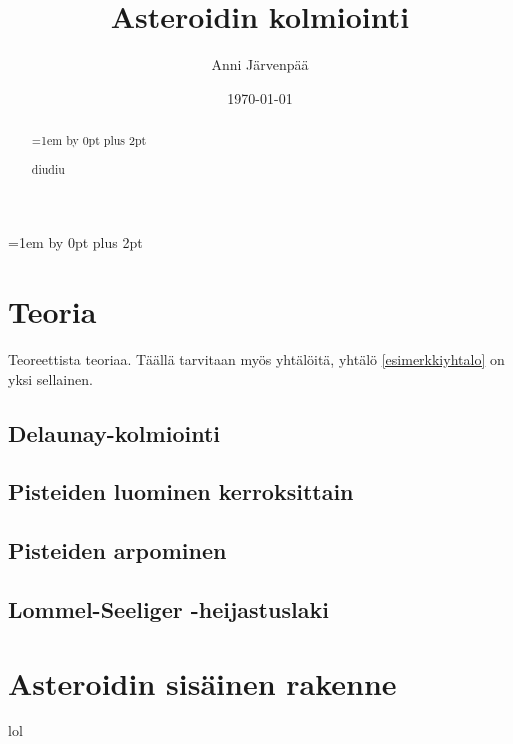 \documentclass[12pt,a4paper,titlepage]{article}
\title{Asteroidin kolmiointi\vspace{0.5em}}
\author{Anni Järvenpää}
\date{\today}
\begin{document}
\maketitle
{}
\begin{abstract}
\setlength{\parindent}{0pt}
\parskip=1em \advance\parskip by 0pt plus 2pt
\onehalfspacing

\noindent
diudiu
\end{abstract}
\restoregeometry

\newpage
\thispagestyle{empty}
\tableofcontents
\newpage
\setcounter{page}{1}
\parskip=1em \advance\parskip by 0pt plus 2pt
\pagestyle{fancy}


\section{Teoria}
Teoreettista teoriaa. Täällä tarvitaan myös yhtälöitä, yhtälö \ref{esimerkkiyhtalo} on yksi sellainen.

\subsection{Delaunay-kolmiointi}

\subsection{Pisteiden luominen kerroksittain}

\subsection{Pisteiden arpominen}

\subsection{Lommel-Seeliger -heijastuslaki}



\section{Asteroidin sisäinen rakenne}
lol
\end{document}
